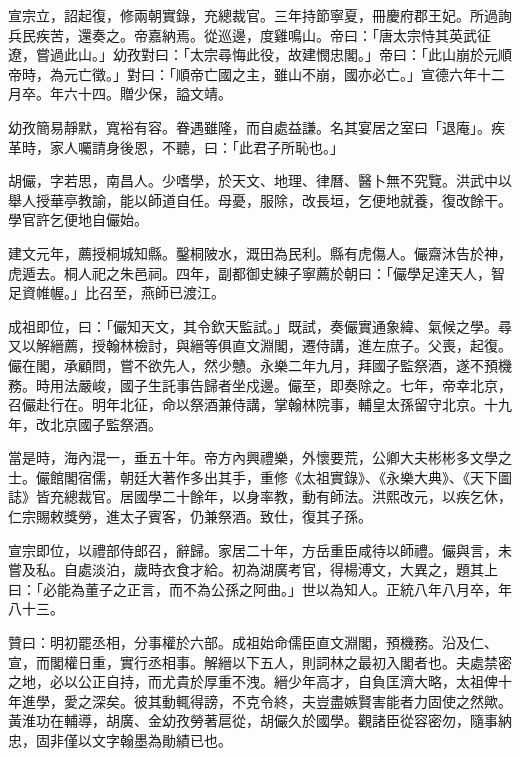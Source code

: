 \begin{pinyinscope}
宣宗立，詔起復，修兩朝實錄，充總裁官。三年持節寧夏，冊慶府郡王妃。所過詢兵民疾苦，還奏之。帝嘉納焉。從巡邊，度雞鳴山。帝曰：「唐太宗恃其英武征遼，嘗過此山。」幼孜對曰：「太宗尋悔此役，故建憫忠閣。」帝曰：「此山崩於元順帝時，為元亡徵。」對曰：「順帝亡國之主，雖山不崩，國亦必亡。」宣德六年十二月卒。年六十四。贈少保，謚文靖。

幼孜簡易靜默，寬裕有容。眷遇雖隆，而自處益謙。名其宴居之室曰「退庵」。疾革時，家人囑請身後恩，不聽，曰：「此君子所恥也。」

胡儼，字若思，南昌人。少嗜學，於天文、地理、律曆、醫卜無不究覽。洪武中以舉人授華亭教諭，能以師道自任。母憂，服除，改長垣，乞便地就養，復改餘干。學官許乞便地自儼始。

建文元年，薦授桐城知縣。鑿桐陂水，溉田為民利。縣有虎傷人。儼齋沐告於神，虎遁去。桐人祀之朱邑祠。四年，副都御史練子寧薦於朝曰：「儼學足達天人，智足資帷幄。」比召至，燕師已渡江。

成祖即位，曰：「儼知天文，其令欽天監試。」既試，奏儼實通象緯、氣候之學。尋又以解縉薦，授翰林檢討，與縉等俱直文淵閣，遷侍講，進左庶子。父喪，起復。儼在閣，承顧問，嘗不欲先人，然少戇。永樂二年九月，拜國子監祭酒，遂不預機務。時用法嚴峻，國子生託事告歸者坐戍邊。儼至，即奏除之。七年，帝幸北京，召儼赴行在。明年北征，命以祭酒兼侍講，掌翰林院事，輔皇太孫留守北京。十九年，改北京國子監祭酒。

當是時，海內混一，垂五十年。帝方內興禮樂，外懷要荒，公卿大夫彬彬多文學之士。儼館閣宿儒，朝廷大著作多出其手，重修《太祖實錄》、《永樂大典》、《天下圖誌》皆充總裁官。居國學二十餘年，以身率教，動有師法。洪熙改元，以疾乞休，仁宗賜敕獎勞，進太子賓客，仍兼祭酒。致仕，復其子孫。

宣宗即位，以禮部侍郎召，辭歸。家居二十年，方岳重臣咸待以師禮。儼與言，未嘗及私。自處淡泊，歲時衣食才給。初為湖廣考官，得楊溥文，大異之，題其上曰：「必能為董子之正言，而不為公孫之阿曲。」世以為知人。正統八年八月卒，年八十三。

贊曰：明初罷丞相，分事權於六部。成祖始命儒臣直文淵閣，預機務。沿及仁、宣，而閣權日重，實行丞相事。解縉以下五人，則詞林之最初入閣者也。夫處禁密之地，必以公正自持，而尤貴於厚重不洩。縉少年高才，自負匡濟大略，太祖俾十年進學，愛之深矣。彼其動輒得謗，不克令終，夫豈盡嫉賢害能者力固使之然歟。黃淮功在輔導，胡廣、金幼孜勞著扈從，胡儼久於國學。觀諸臣從容密勿，隨事納忠，固非僅以文字翰墨為勛績已也。


\end{pinyinscope}